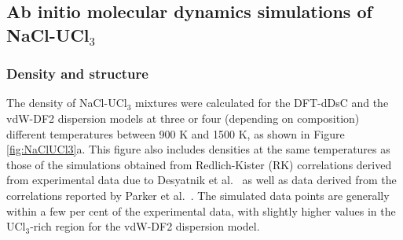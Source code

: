 \documentclass[preprint,3p,10pt,onecolumn,number,sort&compress]{elsarticle}
\begin{document}
{%




\FloatBarrier

\subsection{Ab initio molecular dynamics simulations of NaCl-UCl$_3$}
\subsubsection{Density and structure}
The density of NaCl-UCl$_3$ mixtures were calculated for the DFT-dDsC and the vdW-DF2 dispersion models at three or four (depending on composition) different temperatures between 900 K and 1500 K, as shown in Figure \ref{fig:NaClUCl3}a. This figure also includes densities at the same temperatures as those of the simulations obtained from Redlich-Kister (RK) correlations \cite{agca2022} derived from experimental data due to Desyatnik et al.~\cite{Desyatnik} as well as data derived from the correlations reported by Parker et al.~\cite{Parker}. The simulated data points are generally within a few per cent of the experimental data, with slightly higher values in the UCl$_3$-rich region for the vdW-DF2 dispersion model.

}
\end{document}
